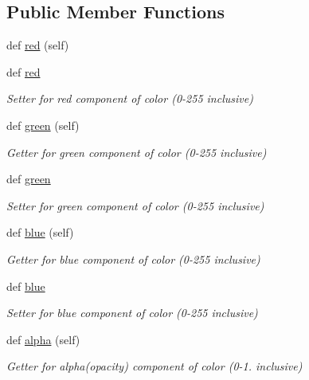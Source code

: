 \subsection*{Public Member Functions}
\begin{DoxyCompactItemize}
\item 
def \hyperlink{classbridges_1_1color_1_1_color_ab2b29fe67b6ad8dddde7ff8eddedcce0}{red} (self)
\item 
def \hyperlink{classbridges_1_1color_1_1_color_a39719b281c9095293a1445c6deb7792b}{red}
\begin{DoxyCompactList}\small\item\em Setter for red component of color (0-\/255 inclusive) \end{DoxyCompactList}\item 
def \hyperlink{classbridges_1_1color_1_1_color_a86ec858a55491936054abcea865498ec}{green} (self)
\begin{DoxyCompactList}\small\item\em Getter for green component of color (0-\/255 inclusive) \end{DoxyCompactList}\item 
def \hyperlink{classbridges_1_1color_1_1_color_a4c0826514c64b53910270336d357ad80}{green}
\begin{DoxyCompactList}\small\item\em Setter for green component of color (0-\/255 inclusive) \end{DoxyCompactList}\item 
def \hyperlink{classbridges_1_1color_1_1_color_a14f94eb29dcabf578a1932c5477e12f3}{blue} (self)
\begin{DoxyCompactList}\small\item\em Getter for blue component of color (0-\/255 inclusive) \end{DoxyCompactList}\item 
def \hyperlink{classbridges_1_1color_1_1_color_a0673063270c8a522b086a916f09dd1f5}{blue}
\begin{DoxyCompactList}\small\item\em Setter for blue component of color (0-\/255 inclusive) \end{DoxyCompactList}\item 
def \hyperlink{classbridges_1_1color_1_1_color_ae5dc631fcda27156867b21109620ae21}{alpha} (self)
\begin{DoxyCompactList}\small\item\em Getter for alpha(opacity) component of color (0-\/1. inclusive) \end{DoxyCompactList}\item 

\end{DoxyCompactItemize}
